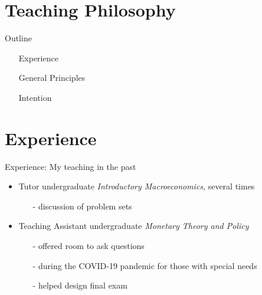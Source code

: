 

\section*{Teaching Philosophy}

\begin{frame}{Outline}
	\vspace{-15mm}\hspace{-10mm}
	\begin{minipage}{1\textwidth}
		\begin{itemize}
			\item[] Experience
			\vspace{6mm}
			\item[] General Principles
			\vspace{6mm}
			\item[] Intention
		\end{itemize}
		
	\end{minipage}
\end{frame}
\section*{Experience}
\begin{frame}{Experience: My teaching in the past}
	\begin{itemize}[<+->]
		\item Tutor undergraduate \textit{Introductory  Macroeconomics}, several times
		\vspace{2mm}
		\begin{itemize}
			\item[-] discussion of problem sets
		\end{itemize}
		\vspace{3mm}
		\item Teaching Assistant undergraduate \textit{Monetary Theory and Policy} 
		\vspace{2mm}		
		\begin{itemize}
			\item[-] offered room to ask questions 
			\item[-] during the COVID-19 pandemic for those with special needs
			\item[-] helped design final exam
		\end{itemize}
	\end{itemize}
\end{frame}

